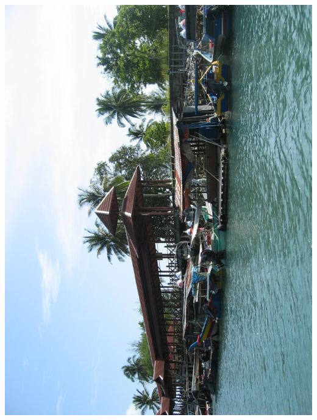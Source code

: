 \newpage\vspace*{-5cm}
\thispagestyle{empty}
\hspace*{-4cm}
\includegraphics[width=15.9cm]{articles/pagesCentrales/IMG_1204.JPG}

